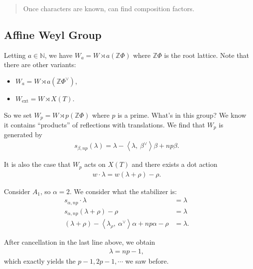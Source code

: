 \begin{quote}
Once characters are known, can find composition factors.
\end{quote}

\hypertarget{affine-weyl-group}{%
\subsection{Affine Weyl Group}\label{affine-weyl-group}}

Letting \(a\in {\mathbb{N}}\), we have
\(W_a = W\rtimes a({\mathbb{Z}}\Phi)\) where \({\mathbb{Z}}\Phi\) is the
root lattice. Note that there are other variants:

\begin{itemize}
\tightlist
\item
  \(W_a = W\rtimes a({\mathbb{Z}}\Phi^\vee)\),
\item
  \(W_{\text{ext}} = W \rtimes X(T)\).
\end{itemize}

So we set \(W_p = W\rtimes p({\mathbb{Z}}\Phi)\) where \(p\) is a prime.
What's in this group? We know it contains ``products'' of reflections
with translations. We find that \(W_p\) is generated by
\begin{align*}  
s_{\beta, np}(\lambda) = \lambda - {\left\langle {\lambda},~{\beta^\vee} \right\rangle}\beta + np \beta
.\end{align*}

It is also the case that \(W_p\) acts on \(X(T)\) and there exists a dot
action
\begin{align*}  
w\cdot \lambda = w(\lambda + \rho) - \rho
.\end{align*}

\begin{example}

Consider \(A_1\), so \(\alpha = 2\). We consider what the stabilizer is:
\begin{align*}  
s_{\alpha, np}\cdot \lambda &= \lambda \\
s_{\alpha, np}(\lambda + \rho) - \rho &= \lambda \\
(\lambda + \rho) - {\left\langle {\lambda _ \rho},~{\alpha^\vee} \right\rangle}\alpha + np\alpha - \rho &= \lambda
.\end{align*}

After cancellation in the last line above, we obtain
\begin{align*}  
\lambda = np-1
,\end{align*}
which exactly yields the \(p-1, 2p-1, \cdots\) we saw before.

\end{example}


